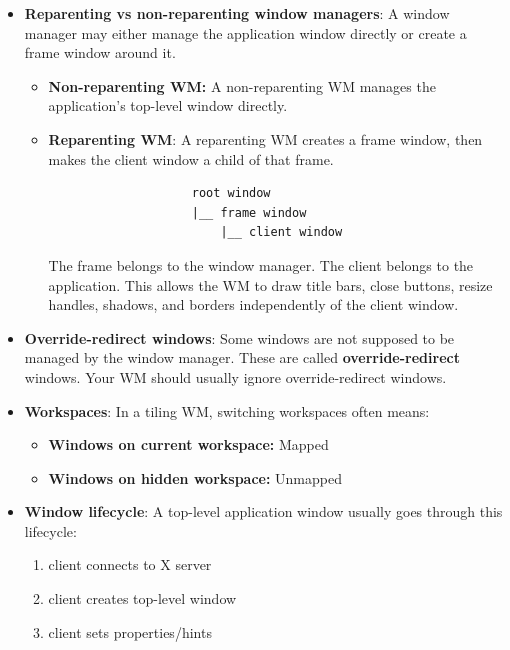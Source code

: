 \documentclass{report}
\begin{document}
\begin{itemize}
\begin{enumerate}
            \item \textbf{WM:} sends XMoveResizeWindow / XMapWindow / XConfigureWindow / etc.
        \end{enumerate}
    \item \textbf{Reparenting vs non-reparenting window managers}: A window manager may either manage the application window directly or create a frame window around it.
        \begin{itemize}
            \item \textbf{Non-reparenting WM:} A non-reparenting WM manages the application’s top-level window directly.
            \item \textbf{Reparenting WM}: A reparenting WM creates a frame window, then makes the client window a child of that frame.
                \bigbreak \noindent 
                \begin{verbatim}
                    root window
                    |__ frame window
                        |__ client window
                \end{verbatim}
                The frame belongs to the window manager. The client belongs to the application. This allows the WM to draw title bars, close buttons, resize handles, shadows, and borders independently of the client window.
        \end{itemize}
    \item \textbf{Override-redirect windows}: Some windows are not supposed to be managed by the window manager. These are called \textbf{override-redirect} windows.
        \bigbreak \noindent 
        Your WM should usually ignore override-redirect windows.
    \item \textbf{Workspaces}: In a tiling WM, switching workspaces often means:
        \begin{itemize}
            \item \textbf{Windows on current workspace:} Mapped
            \item \textbf{Windows on hidden workspace:} Unmapped
        \end{itemize}
    \item \textbf{Window lifecycle}: A top-level application window usually goes through this lifecycle:
        \bigbreak \noindent 
        \begin{enumerate}
            \item client connects to X server
            \item client creates top-level window
            \item client sets properties/hints

\end{enumerate}
\end{itemize}
\end{document}
